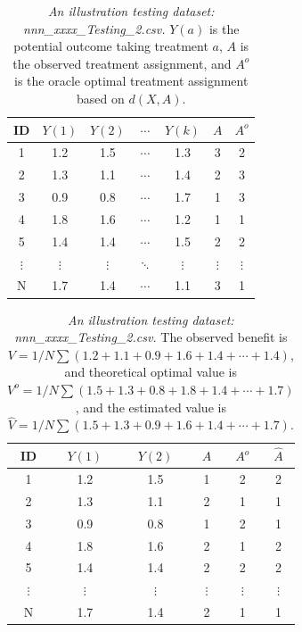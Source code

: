 \documentclass[12pt]{article}
\def\hat{\widehat}
\begin{document}
\begin{table}[htbp]
  \centering
  \caption{\emph{An illustration testing dataset: nnn\_xxxx\_Testing\_2.csv.} $Y(a)$ is the potential outcome taking treatment $a$, $A$ is the observed treatment assignment, and $A^o$ is the oracle optimal treatment assignment based on $d(X,A)$.}
    \begin{tabular}{c|cccc|cc}
    \hline
    \hline
    ID &  $Y(1)$    & $Y(2)$    & $\cdots$  & $Y(k)$ & $A$ & $A^o$   \\
    \hline
    1& 1.2    & 1.5    &  $\cdots$  & 1.3 & 3 & 2 \\
    2& 1.3    & 1.1    &  $\cdots$  & 1.4 & 2 & 3 \\
    3& 0.9    & 0.8    &  $\cdots$  & 1.7 & 1 & 3 \\
    4& 1.8    & 1.6    &  $\cdots$  & 1.2 & 1 & 1 \\
    5& 1.4    & 1.4    &  $\cdots$  & 1.5 & 2 & 2 \\
    $\vdots$ &  $\vdots$   & $\vdots$     & $\ddots$     & $\vdots$ &  $\vdots$   & $\vdots$ \\
    N & 1.7    & 1.4    &  $\cdots$  & 1.1 & 3 & 1 \\
    \hline
    \hline
    \end{tabular}%
  \label{tab:TestingDataExample2}%
\end{table}


\begin{table}[htbp]
	\centering
	\caption{\emph{An illustration testing dataset: nnn\_xxxx\_Testing\_2.csv.} The observed benefit is $V=1/N \sum (1.2+1.1+0.9+1.6+1.4+\cdots+1.4)$, and theoretical optimal value is $V^o=1/N \sum (1.5+1.3+0.8+1.8+1.4+\cdots+1.7)$, and the estimated value is $\hat{V}=1/N \sum (1.5+1.3+0.9+1.6+1.4+\cdots+1.7)$.}
	\begin{tabular}{c|cc|ccc}
		\hline
		\hline
		ID &  $Y(1)$    & $Y(2)$    & $A$ & $A^o$ & $\hat{A} $  \\
		\hline
		1& 1.2    & 1.5    &   1& 2 &2 \\
		2& 1.3    & 1.1    &  2 & 1 &1\\
		3& 0.9    & 0.8    &    1 & 2 &1 \\
		4& 1.8    & 1.6    &   2 & 1 &2 \\
		5& 1.4    & 1.4    &  2 & 2 &2 \\
		$\vdots$ &  $\vdots$   & $\vdots$     & $\vdots$     & $\vdots$ &  $\vdots$    \\
		N & 1.7    & 1.4    &   2 & 1 &1\\
		\hline
		\hline
	\end{tabular}%
	\label{tab:TestingDataExample2}%
\end{table}
\end{document}
